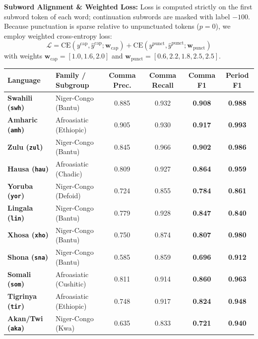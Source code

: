 \documentclass[11pt,a4paper]{article}
\begin{document}
\noindent \textbf{Subword Alignment \& Weighted Loss:}
Loss is computed strictly on the first subword token of each word; continuation subwords are masked with label $-100$. Because punctuation is sparse relative to unpunctuated tokens ($p=0$), we employ weighted cross-entropy loss:
\begin{equation}
    \mathcal{L} = \text{CE}(y^{\text{cap}}, \hat{y}^{\text{cap}}; \mathbf{w}_{\text{cap}}) + \text{CE}(y^{\text{punct}}, \hat{y}^{\text{punct}}; \mathbf{w}_{\text{punct}})
\end{equation}
with weights $\mathbf{w}_{\text{cap}} = [1.0, 1.6, 2.0]$ and $\mathbf{w}_{\text{punct}} = [0.6, 2.2, 1.8, 2.5, 2.5]$.

\begin{table}[t]
\centering
\small
\begin{tabularx}{\linewidth}{llcccc}
\toprule
\textbf{Language} & \textbf{Family / Subgroup} & \textbf{Comma Prec.} & \textbf{Comma Recall} & \textbf{Comma F1} & \textbf{Period F1} \\
\midrule
\textbf{Swahili (\texttt{swh})} & Niger-Congo (Bantu) & 0.885 & 0.932 & \textbf{0.908} & \textbf{0.988} \\
\textbf{Amharic (\texttt{amh})} & Afroasiatic (Ethiopic) & 0.905 & 0.930 & \textbf{0.917} & \textbf{0.993} \\
\textbf{Zulu (\texttt{zul})} & Niger-Congo (Bantu) & 0.845 & 0.966 & \textbf{0.902} & \textbf{0.986} \\
\textbf{Hausa (\texttt{hau})} & Afroasiatic (Chadic) & 0.809 & 0.927 & \textbf{0.864} & \textbf{0.959} \\
\textbf{Yoruba (\texttt{yor})} & Niger-Congo (Defoid) & 0.724 & 0.855 & \textbf{0.784} & \textbf{0.861} \\
\textbf{Lingala (\texttt{lin})} & Niger-Congo (Bantu) & 0.779 & 0.928 & \textbf{0.847} & \textbf{0.840} \\
\textbf{Xhosa (\texttt{xho})} & Niger-Congo (Bantu) & 0.750 & 0.874 & \textbf{0.807} & \textbf{0.980} \\
\textbf{Shona (\texttt{sna})} & Niger-Congo (Bantu) & 0.585 & 0.859 & \textbf{0.696} & \textbf{0.912} \\
\textbf{Somali (\texttt{som})} & Afroasiatic (Cushitic) & 0.811 & 0.914 & \textbf{0.860} & \textbf{0.963} \\
\textbf{Tigrinya (\texttt{tir})} & Afroasiatic (Ethiopic) & 0.748 & 0.917 & \textbf{0.824} & \textbf{0.948} \\
\textbf{Akan/Twi (\texttt{aka})} & Niger-Congo (Kwa) & 0.635 & 0.833 & \textbf{0.721} & \textbf{0.940} \\

\end{tabularx}
\end{table}
\end{document}
